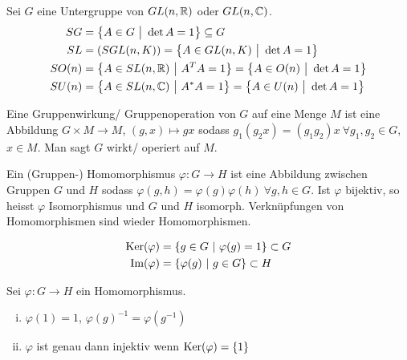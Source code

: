 \begin{definition}
    Sei $G$ eine Untergruppe von $GL(n,\mathbb{R})$ oder $GL(n,\mathbb{C})$.
    \begin{align*}
        SG &= \left\{ A \in G \ \big| \ \det A = 1 \right\} \subseteq G
        \\
        SL &= \left( SGL(n,K) \right) = \left\{ A \in GL(n,K) \ \big| \ \det A = 1 \right\}
        \\
        SO(n) &= \left\{ A \in SL(n,\mathbb{R}) \ \big| \ A^T A = 1 \right\} = \left\{ A \in O(n) \ \big| \ \det A = 1 \right\}
        \\
        SU(n) &= \left\{ A \in SL(n,\mathbb{C}) \ \big| \ A^* A = 1 \right\} = \left\{ A \in U(n) \ \big| \ \det A = 1 \right\}
    \end{align*}
\end{definition}

\begin{definition}
    Eine Gruppenwirkung/ Gruppenoperation von $G$ auf eine Menge $M$ ist eine
    Abbildung $G \times M \rightarrow M$, $(g,x) \mapsto gx$ sodass
    $g_1 (g_2 x) = (g_1 g_2) x \ \forall g_1 , g_2 \in G$, $x \in M$. Man sagt
    $G$ wirkt/ operiert auf $M$.
\end{definition}

\begin{definition}[Gruppenhomomorphismus]
    Ein (Gruppen-) Homomorphismus $\varphi: G \rightarrow H$ ist eine Abbildung
    zwischen Gruppen $G$ und $H$ sodass $\varphi(g,h) = \varphi(g) \varphi(h)
    \ \forall g,h \in G$. Ist $\varphi$ bijektiv, so heisst $\varphi$
    Isomorphismus und $G$ und $H$ isomorph. Verknüpfungen von Homomorphismen
    sind wieder Homomorphismen.
\end{definition}

\begin{definition}
    \begin{align*}
        \ker(\varphi) &= \geschwungeneklammer{g \in G \ | \ \varphi(g) = 1} \subset G
        \\
        \Im(\varphi) &= \geschwungeneklammer{\varphi(g) \ | \ g \in G} \subset H
    \end{align*}
\end{definition}

\begin{satz}
    Sei $\varphi: G \rightarrow H$ ein Homomorphismus.
    \begin{enumerate}[(i)]
        \item $\varphi(1) = 1$, $\varphi(g)^{-1} = \varphi(g^{-1})$
        \item $\varphi$ ist genau dann injektiv wenn $\text{Ker}(\varphi) = \left\{ 1 \right\}$
    \end{enumerate}
\end{satz}


